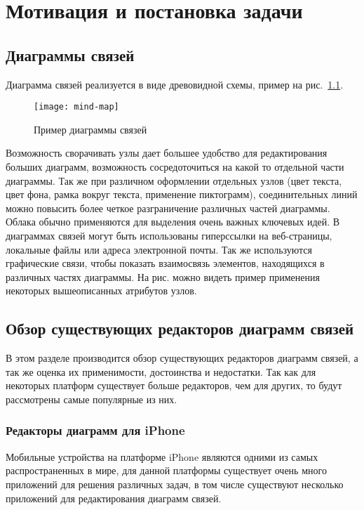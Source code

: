 \newpage

\chapter{Мотивация и постановка задачи}\label{ch:chapter_1}

\section{Диаграммы связей}
Диаграмма связей реализуется в виде древовидной схемы, пример на
рис.~\ref{ris:mindmap}. \begin{figure}[h!] \centering
\texttt{[image: mind-map]}
\caption{Пример диаграммы связей}
\label{ris:mindmap}
\end{figure}

Возможность сворачивать узлы дает большее удобство для редактирования больших
диаграмм, возможность сосредоточиться на какой то отдельной части диаграммы. Так
же при различном оформлении отдельных узлов (цвет текста, цвет фона, рамка
вокруг текста, применение пиктограмм), соединительных линий можно повысить более
четкое разграничение различных частей диаграммы. Облака обычно применяются для
выделения очень важных ключевых идей. В диаграммах связей могут быть
использованы гиперссылки на веб-страницы, локальные файлы или адреса электронной
почты. Так же используются графические связи, чтобы показать взаимосвязь
элементов, находящихся в различных частях диаграммы. На рис. можно видеть пример
применения некоторых вышеописанных атрибутов узлов.

\section{Обзор существующих редакторов диаграмм связей}\label{sec:overview_of_mind_map}

В этом разделе производится обзор существующих редакторов диаграмм связей, а так
же оценка их применимости, достоинства и недостатки. Так как для некоторых
платформ существует больше редакторов, чем для других, то будут рассмотрены
самые популярные из них.

\subsection{Редакторы диаграмм для iPhone}

Мобильные устройства на платформе iPhone являются одними из самых
распространенных в мире, для данной платформы существует очень много приложений
для решения различных задач, в том числе существуют несколько приложений для
редактирования диаграмм связей.

